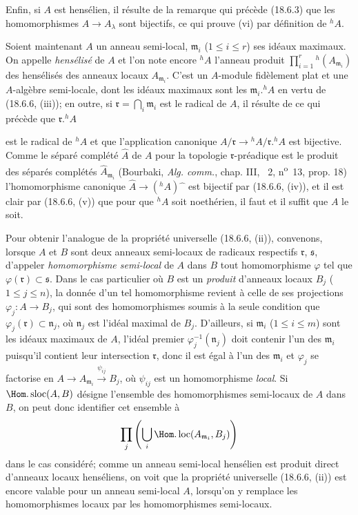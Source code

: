 Enfin, si $A$ est hensélien, il résulte de la remarque qui précède (18.6.3) que les homomorphismes $A\to A_\lambda$ sont bijectifs, ce qui prouve (vi) par définition de ${}^h\!A$.

\begin{env}[18.6.7]
\label{IV.18.6.7}
Soient maintenant $A$ un anneau semi-local, $\mathfrak m_i$ ($1\leq i\leq r$) ses idéaux maximaux. On appelle \emph{hensélisé} de $A$ et l'on note encore ${}^h\!A$ l'anneau produit $\prod_{i=1}^r{}^h(A_{\mathfrak m_i})$ des hensélisés des anneaux locaux $A_{\mathfrak m_i}$. C'est un $A$-module fidèlement plat et une $A$-algèbre semi-locale, dont les idéaux maximaux sont les $\mathfrak m_i.{}^h\!A$ en vertu de (18.6.6, (iii)); en outre, si $\mathfrak r=\bigcap_i\mathfrak m_i$ est le radical de $A$, il résulte de ce qui précède que $\mathfrak r.{}^h\!A$


est le radical de ${}^h\!A$ et que l'application canonique $A/\mathfrak r\to{}^h\!A/\mathfrak r.{}^h\!A$ est bijective. Comme le séparé complété $\widehat A$ de $A$ pour la topologie $\mathfrak r$-préadique est le produit des séparés complétés $\widehat A_{\mathfrak m_i}$ (Bourbaki, \emph{Alg. comm.}, chap. III, \textsection~2, n\textsuperscript{o}~13, prop. 18) l'homomorphisme canonique $\widehat A\to({}^h\!A)\widehat{\phantom{x}}$ est bijectif par (18.6.6, (iv)), et il est clair par (18.6.6, (v)) que pour que ${}^h\!A$ soit noethérien, il faut et il suffit que $A$ le soit.

Pour obtenir l'analogue de la propriété universelle (18.6.6, (ii)), convenons, lorsque $A$ et $B$ sont deux anneaux semi-locaux de radicaux respectifs $\mathfrak r$, $\mathfrak s$, d'appeler \emph{homomorphisme semi-local} de $A$ dans $B$ tout homomorphisme $\varphi$ tel que $\varphi(\mathfrak r)\subset\mathfrak s$. Dans le cas particulier où $B$ est un \emph{produit} d'anneaux locaux $B_j$ ($1\leq j\leq n$), la donnée d'un tel homomorphisme revient à celle de ses projections $\varphi_j:A\to B_j$, qui sont des homomorphismes soumis à la seule condition que $\varphi_j(\mathfrak r)\subset\mathfrak n_j$, où $\mathfrak n_j$ est l'idéal maximal de $B_j$. D'ailleurs, si $\mathfrak m_i$ ($1\leq i\leq m$) sont les idéaux maximaux de $A$, l'idéal premier $\varphi_j^{-1}(\mathfrak n_j)$ doit contenir l'un des $\mathfrak m_i$ puisqu'il contient leur intersection $\mathfrak r$, donc il est égal à l'un des $\mathfrak m_i$ et $\varphi_j$ se factorise en $A\to A_{\mathfrak m_i}\xrightarrow{\psi_{ij}}B_j$, où $\psi_{ij}$ est un homomorphisme \emph{local}. Si $\Hom.\operatorname{sloc}(A,B)$ désigne l'ensemble des homomorphismes semi-locaux de $A$ dans $B$, on peut donc identifier cet ensemble à
\[
  \prod_j\left(\bigcup_i\Hom.\operatorname{loc}(A_{\mathfrak m_i},B_j)\right)
\]
dans le cas considéré; comme un anneau semi-local hensélien est produit direct d'anneaux locaux henséliens, on voit que la propriété universelle (18.6.6, (ii)) est encore valable pour un anneau semi-local $A$, lorsqu'on y remplace les homomorphismes locaux par les homomorphismes semi-locaux.
\end{env}

